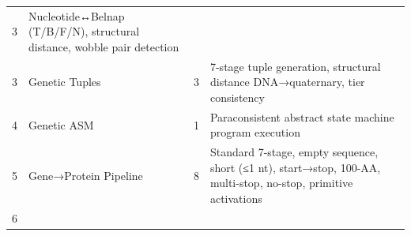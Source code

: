 \documentclass[12pt,a4paper]{article}
\begin{document}
\begin{longtable}[]{@{}llll@{}}
\begin{minipage}[t]{0.20\columnwidth}
3\strut
\end{minipage} & \begin{minipage}[t]{0.29\columnwidth}\raggedright
Nucleotide↔Belnap (T/B/F/N), structural distance, wobble pair
detection\strut
\end{minipage}\tabularnewline
\begin{minipage}[t]{0.09\columnwidth}\raggedright
3\strut
\end{minipage} & \begin{minipage}[t]{0.31\columnwidth}\raggedright
Genetic Tuples\strut
\end{minipage} & \begin{minipage}[t]{0.20\columnwidth}\raggedright
3\strut
\end{minipage} & \begin{minipage}[t]{0.29\columnwidth}\raggedright
7-stage tuple generation, structural distance DNA→quaternary, tier
consistency\strut
\end{minipage}\tabularnewline
\begin{minipage}[t]{0.09\columnwidth}\raggedright
4\strut
\end{minipage} & \begin{minipage}[t]{0.31\columnwidth}\raggedright
Genetic ASM\strut
\end{minipage} & \begin{minipage}[t]{0.20\columnwidth}\raggedright
1\strut
\end{minipage} & \begin{minipage}[t]{0.29\columnwidth}\raggedright
Paraconsistent abstract state machine program execution\strut
\end{minipage}\tabularnewline
\begin{minipage}[t]{0.09\columnwidth}\raggedright
5\strut
\end{minipage} & \begin{minipage}[t]{0.31\columnwidth}\raggedright
Gene→Protein Pipeline\strut
\end{minipage} & \begin{minipage}[t]{0.20\columnwidth}\raggedright
8\strut
\end{minipage} & \begin{minipage}[t]{0.29\columnwidth}\raggedright
Standard 7-stage, empty sequence, short (≤1 nt), start→stop, 100-AA,
multi-stop, no-stop, primitive activations\strut
\end{minipage}\tabularnewline
\begin{minipage}[t]{0.09\columnwidth}\raggedright
6\strut
\end{minipage} & \begin{minipage}[t]{0.31\columnwidth}\raggedright

\end{minipage}
\end{longtable}
\end{document}
